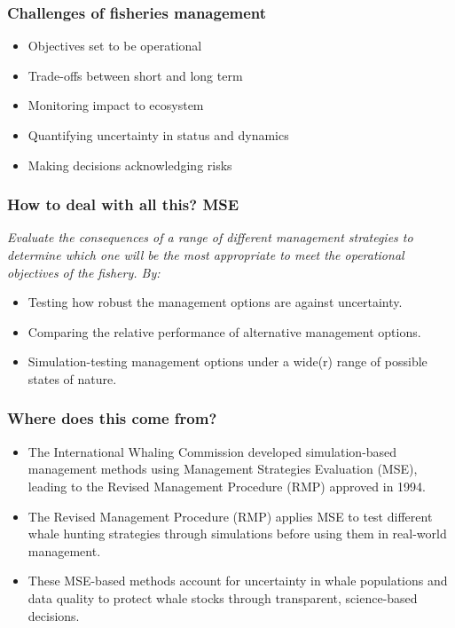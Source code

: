 \documentclass{beamer}
\begin{document}
\begin{frame}
\frametitle{Challenges of fisheries management}

\begin{itemize}
  \item Objectives set to be operational
  \item Trade-offs between short and long term
  \item Monitoring impact to ecosystem
  \item Quantifying uncertainty in status and dynamics
  \item Making decisions acknowledging risks
\end{itemize}

\end{frame}

\begin{frame}
\frametitle{How to deal with all this? MSE}

\emph{Evaluate the consequences of a range of different management strategies to determine which one will be the most appropriate to meet the operational objectives of the fishery. By:}

\begin{itemize}
	\item Testing how robust the management options are against uncertainty.
    \item Comparing the relative performance of alternative management options.
    \item Simulation-testing management options under a wide(r) range of possible states of nature.
\end{itemize}

\end{frame}

\begin{frame}
\frametitle{Where does this come from?}

\begin{itemize}	
	\item The International Whaling Commission developed simulation-based management methods using Management Strategies Evaluation (MSE), leading to the Revised Management Procedure (RMP) approved in 1994.
	\item The Revised Management Procedure (RMP) applies MSE to test different whale hunting strategies through simulations before using them in real-world management.
	\item These MSE-based methods account for uncertainty in whale populations and data quality to protect whale stocks through transparent, science-based decisions.
\end{itemize}

\end{frame}
\end{document}
